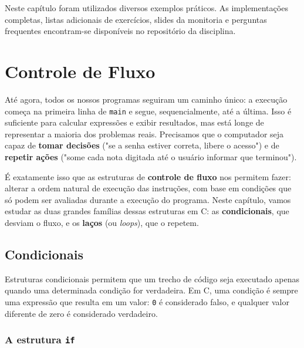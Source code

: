 \documentclass[12pt,a4paper,oneside]{extreport}
\begin{document}
\begin{tcolorbox}[title=Material Complementar]

Neste capítulo foram utilizados diversos exemplos práticos. As implementações completas, listas adicionais de exercícios, slides da monitoria e perguntas frequentes encontram-se disponíveis no repositório da disciplina.

\end{tcolorbox}




\chapter{Controle de Fluxo}

Até agora, todos os nossos programas seguiram um caminho único: a execução começa na primeira linha de \texttt{main} e segue, sequencialmente, até a última. Isso é suficiente para calcular expressões e exibir resultados, mas está longe de representar a maioria dos problemas reais. Precisamos que o computador seja capaz de \textbf{tomar decisões} ("se a senha estiver correta, libere o acesso") e de \textbf{repetir ações} ("some cada nota digitada até o usuário informar que terminou").

É exatamente isso que as estruturas de \textbf{controle de fluxo} nos permitem fazer: alterar a ordem natural de execução das instruções, com base em condições que só podem ser avaliadas durante a execução do programa. Neste capítulo, vamos estudar as duas grandes famílias dessas estruturas em C: as \textbf{condicionais}, que desviam o fluxo, e os \textbf{laços} (ou \textit{loops}), que o repetem.

\section{Condicionais}

Estruturas condicionais permitem que um trecho de código seja executado apenas quando uma determinada condição for verdadeira. Em C, uma condição é sempre uma expressão que resulta em um valor: \texttt{0} é considerado falso, e qualquer valor diferente de zero é considerado verdadeiro.

\subsection{A estrutura \texttt{if}}
\end{document}
